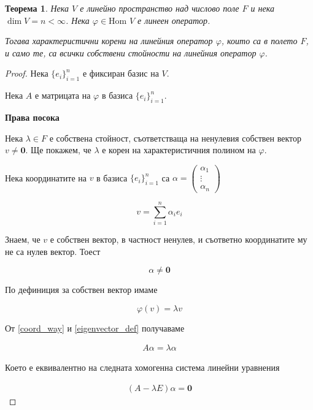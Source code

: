 \documentclass{scrartcl}
\newtheorem{theorem}{Теорема}
\begin{document}
\begin{FlushLeft}
\begin{theorem}
Нека $V$ е линейно пространство над числово поле $F$ и нека $\dim V = n < \infty$.
Нека $\varphi \in \text{Hom }{V}$ е линеен оператор.

Тогава характеристични корени на линейния оператор $\varphi$, които са в полето $F$, и само те, са всички собствени стойности на линейния оператор $\varphi$.
\end{theorem}

\begin{proof}
Нека $\{e_i\}_{i=1}^n$ е фиксиран базис на $V$.

Нека $A$ е матрицата на $\varphi$ в базиса $\{e_i\}_{i=1}^n$.

\textbf{Права посока}

Нека $\lambda \in F$ е собствена стойност, съответстваща на ненулевия собствен вектор $v \neq \mathbf{0}$. Ще покажем, че $\lambda$ е корен на характеристичния полином на $\varphi$.

Нека координатите на $v$ в базиса $\{e_i\}_{i=1}^n$ са $\alpha = \begin{pmatrix}
    \alpha_1\\
    \vdots\\
    \alpha_n
\end{pmatrix}$

\begin{equation}\label{coord_way}
    v = \sum_{i=1}^n \alpha_i e_i
\end{equation}

Знаем, че $v$ е собствен вектор, в частност ненулев, и съответно координатите му не са нулев вектор. Тоест

$$\alpha \ne \mathbf{0}$$

По дефиниция за собствен вектор имаме

\begin{equation}\label{eigenvector_def}
    \varphi(v) = \lambda v
\end{equation}

От \eqref{coord_way} и \eqref{eigenvector_def} получаваме

\[
\begin{array}{l}
    A \alpha = \lambda \alpha
\end{array}
\]

Което е еквивалентно на следната хомогенна система линейни уравнения

\[
\begin{array}{|l}
    (A  - \lambda E) \alpha = \mathbf{0}
\end{array}
\]


\end{proof}
\end{FlushLeft}
\end{document}
